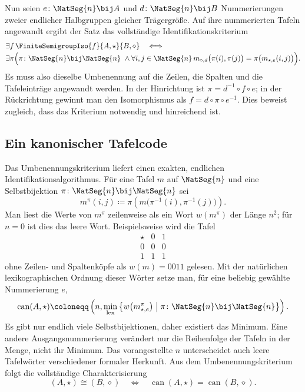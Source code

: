 \documentclass[main.tex]{subfiles}
\begin{document}
Nun seien \(e\colon\NatSeg{n}\bij A\) und
\(d\colon\NatSeg{n}\bij B\) Nummerierungen zweier endlicher
Halbgruppen gleicher Trägergröße.  Auf ihre nummerierten Tafeln
angewandt ergibt der Satz das vollständige Identifikationskriterium
\[
\begin{aligned}
&\exists f\,
  \FiniteSemigroupIso{f}{A,\star}{B,\diamond}
\quad\Longleftrightarrow{}\\[-2pt]
&\exists\pi\Bigl(
  \pi\colon\NatSeg{n}\bij\NatSeg{n}\ \land
  \forall i,j\in\NatSeg{n}\,
  m_{\diamond,d}\bigl(\pi(i),\pi(j)\bigr)
    =\pi\bigl(m_{\star,e}(i,j)\bigr)
  \Bigr).
\end{aligned}
\]
Es muss also dieselbe Umbenennung auf die Zeilen, die Spalten und die
Tafeleinträge angewandt werden.  In der Hinrichtung ist
\(\pi=d^{-1}\circ f\circ e\); in der Rückrichtung gewinnt man den
Isomorphismus als \(f=d\circ\pi\circ e^{-1}\).  Dies beweist zugleich,
dass das Kriterium notwendig und hinreichend ist.

\subsection{Ein kanonischer Tafelcode}

Das Umbenennungskriterium liefert einen exakten, endlichen
Identifikationsalgorithmus.  Für eine Tafel \(m\) auf \(\NatSeg{n}\)
und eine Selbstbijektion
\(\pi\colon\NatSeg{n}\bij\NatSeg{n}\) sei
\[
  m^{\pi}(i,j)
  \coloneqq
  \pi\!\left(m\bigl(\pi^{-1}(i),\pi^{-1}(j)\bigr)\right).
\]
Man liest die Werte von \(m^{\pi}\) zeilenweise als ein Wort
\(w(m^{\pi})\) der Länge \(n^2\); für \(n=0\) ist dies das leere
Wort.  Beispielsweise wird die Tafel
\[
\begin{array}{c|cc}
\star&0&1\\\hline
0&0&0\\
1&1&1
\end{array}
\]
ohne Zeilen- und Spaltenköpfe als \(w(m)=0011\) gelesen.  Mit der natürlichen
lexikographischen Ordnung dieser Wörter setze man, für eine beliebig gewählte
Nummerierung \(e\),
\[
  \operatorname{can}(A,\star)
  \coloneqq
  \left(
    n,
    \min_{\mathrm{lex}}
    \left\{
      w\!\left(m_{\star,e}^{\pi}\right)
      \;\middle|\;
      \pi\colon\NatSeg{n}\bij\NatSeg{n}
    \right\}
  \right).
\]
Es gibt nur endlich viele Selbstbijektionen, daher existiert das Minimum.
Eine andere Ausgangsnummerierung verändert nur die Reihenfolge der Tafeln
in der Menge, nicht ihr Minimum.  Das vorangestellte \(n\) unterscheidet
auch leere Tafelwörter verschiedener formaler Herkunft.  Aus dem
Umbenennungskriterium folgt die vollständige Charakterisierung
\[
  (A,\star)\cong(B,\diamond)
  \quad\Longleftrightarrow\quad
  \operatorname{can}(A,\star)
    =\operatorname{can}(B,\diamond).
\]
\end{document}
